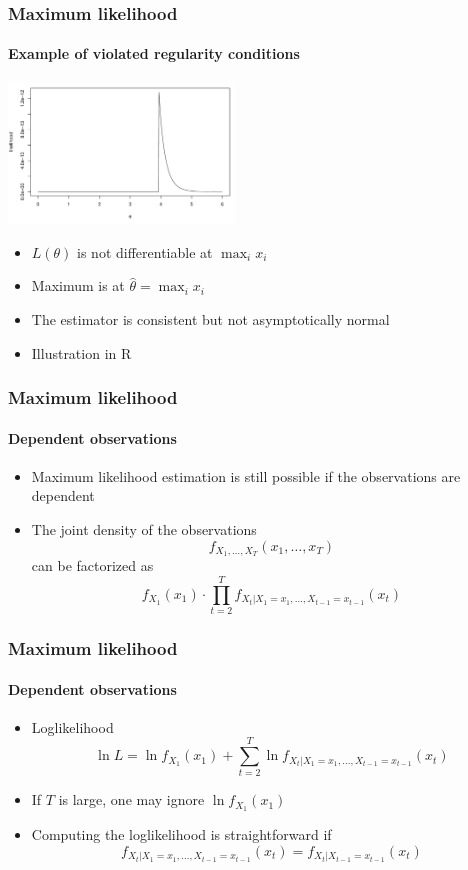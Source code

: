 \documentclass[notes=show]{beamer}
\begin{document}
\begin{frame}\frametitle{Maximum likelihood}\framesubtitle{Example of violated regularity conditions}
\begin{center}
    \includegraphics[width=6cm]{plots/likeliuniform.pdf}\vspace*{-1cm}
\end{center}
\begin{itemize}
    \item $L(\theta )$ is not differentiable at $\max_{i}x_{i}$
    \item Maximum is at $\hat{\theta}=\max_{i}x_{i}$
    \item The estimator is consistent but not asymptotically normal
    \item Illustration in R
\end{itemize}
\end{frame}


\begin{frame}\frametitle{Maximum likelihood}\framesubtitle{Dependent observations}
\begin{itemize}
    \item Maximum likelihood estimation is still possible if the observations are dependent
    \item The joint density of the observations
    \begin{equation*}
        f_{X_{1},\ldots ,X_{T}}\left( x_{1},\ldots ,x_{T}\right)
    \end{equation*}
    can be factorized as
    \begin{equation*}
    f_{X_{1}}(x_{1})\cdot \prod_{t=2}^{T}f_{X_{t}|X_{1}=x_{1},\ldots,X_{t-1}=x_{t-1}}\left( x_{t}\right)
    \end{equation*}
\end{itemize}
\end{frame}


\begin{frame}\frametitle{Maximum likelihood}\framesubtitle{Dependent observations}
\begin{itemize}
    \item Loglikelihood
    \begin{equation*}
        \ln L=\ln f_{X_{1}}(x_{1})+\sum_{t=2}^{T}\ln f_{X_{t}|X_{1}=x_{1},\ldots,X_{t-1}=x_{t-1}}\left( x_{t}\right)
    \end{equation*}
    \item If $T$ is large, one may ignore $\ln f_{X_{1}}(x_{1})$
    \item Computing the loglikelihood is straightforward if
    \begin{equation*}
        f_{X_{t}|X_{1}=x_{1},\ldots ,X_{t-1}=x_{t-1}}\left( x_{t}\right)=f_{X_{t}|X_{t-1}=x_{t-1}}\left( x_{t}\right)
    \end{equation*}
\end{itemize}
\end{frame}
\end{document}

